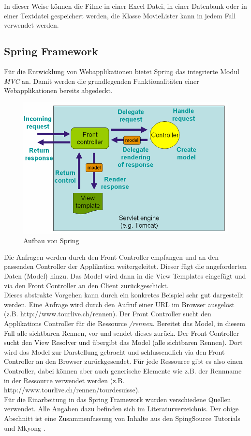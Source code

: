 In dieser Weise können die Filme in einer Excel Datei, in einer Datenbank oder in einer Textdatei gespeichert werden, die Klasse MovieLister kann in jedem Fall verwendet werden.

\subsection{Spring Framework}
Für die Entwicklung von Webapplikationen bietet Spring das integrierte Modul \textit{MVC} an. Damit werden die grundlegenden Funktionalitäten einer Webapplikationen bereits abgedeckt.

\begin{figure}[H]
	\centering
	\includegraphics[width=130mm]{images/tourliveweb/springmvc.png}
	\caption{Aufbau von Spring \cite{springsourcemvc2011}}
	\label{fig:springmvc}
\end{figure}

Die Anfragen werden durch den Front Controller empfangen und an den passenden Controller der Applikation weitergeleitet. Dieser fügt die angeforderten Daten (Model) hinzu. Das Model wird dann in die View Templates eingefügt und via den Front Controller an den Client zurückgeschickt.
\\

Dieses abstrakte Vorgehen kann durch ein konkretes Beispiel sehr gut dargestellt werden. Eine Anfrage wird durch den Aufruf einer URL im Browser ausgelöst (z.B. http://www.tourlive.ch/rennen). Der Front Controller sucht den Applikations Controller für die Ressource \textit{/rennen}. Bereitet das Model, in diesem Fall alle sichtbaren Rennen, vor und sendet dieses zurück. Der Front Controller sucht den View Resolver und übergibt das Model (alle sichtbaren Rennen). Dort wird das Model zur Darstellung gebracht und schlussendlich via den Front Controller an den Browser zurückgesendet. Für jede Ressource gibt es also einen Controller, dabei können aber auch generische Elemente wie z.B. der Rennname in der Ressource verwendet werden (z.B. http://www.tourlive.ch/rennen/tourdesuisse).
\\

Für die Einarbeitung in das Spring Framework wurden verschiedene Quellen verwendet. Alle Angaben dazu befinden sich im Literaturverzeichnis. Der obige Abschnitt ist eine Zusammenfassung von Inhalte aus den SpingSource Tutorials \cite{springsourcemvc2011} und Mkyong \cite{springmvcexamples2011} .